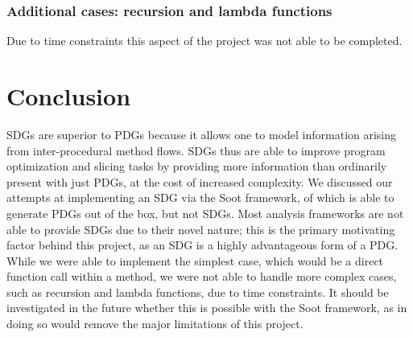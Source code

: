 \documentclass[authoryear,preprint]{sigplanconf}
\begin{document}
\subsubsection{Additional cases: recursion and lambda functions}

Due to time constraints this aspect of the project was not able to be completed.

\section{Conclusion}

SDGs are superior to PDGs because it allows one to model information arising from inter-procedural method flows. SDGs thus are able to improve program optimization and slicing tasks by providing more information than ordinarily present with just PDGs, at the cost of increased complexity. We discussed our attempts at implementing an SDG via the Soot framework, of which is able to generate PDGs out of the box, but not SDGs. Most analysis frameworks are not able to provide SDGs due to their novel nature; this is the primary motivating factor behind this project, as an SDG is a highly advantageous form of a PDG. While we were able to implement the simplest case, which would be a direct function call within a method, we were not able to handle more complex cases, such as recursion and lambda functions, due to time constraints. It should be investigated in the future whether this is possible with the Soot framework, as in doing so would remove the major limitations of this project.






\end{document}
